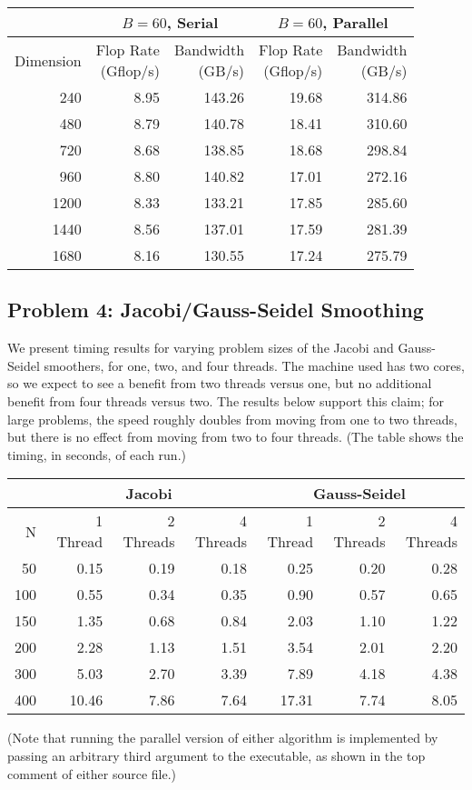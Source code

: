 \documentclass[11pt]{article}
\theoremstyle{plain} %
\begin{document}
\begin{center}
\small
\begin{tabular}{r|rr|rr}
  & \multicolumn{2}{c|}{$B = 60$, Serial} & \multicolumn{2}{c}{$B = 60$, Parallel} \\
  \hline
  Dimension & \makecell{Flop Rate \\ (Gflop/s)} & \makecell{Bandwidth \\ (GB/s)} & \makecell{Flop Rate \\ (Gflop/s)} & \makecell{Bandwidth \\ (GB/s)} \\
  \hline
  240 & 8.95 & 143.26 & 19.68 & 314.86 \\
  480 & 8.79 & 140.78 & 18.41 & 310.60 \\
  720 & 8.68 & 138.85 & 18.68 & 298.84 \\
  960 & 8.80 & 140.82 & 17.01 & 272.16 \\
  1200 & 8.33 & 133.21 & 17.85 & 285.60 \\
  1440 & 8.56 & 137.01 & 17.59 & 281.39 \\
  1680 & 8.16 & 130.55 & 17.24 & 275.79 \\
  \hline
\end{tabular}
\end{center}

\subsection*{Problem 4: Jacobi/Gauss-Seidel Smoothing}

We present timing results for varying problem sizes of the Jacobi and Gauss-Seidel smoothers, for one, two, and four threads.
The machine used has two cores, so we expect to see a benefit from two threads versus one, but no additional benefit from four threads versus two.
The results below support this claim; for large problems, the speed roughly doubles from moving from one to two threads, but there is no effect from moving from two to four threads.
(The table shows the timing, in seconds, of each run.)

\begin{center}
\small
\begin{tabular}{r|rrr|rrr}
  & \multicolumn{3}{c|}{Jacobi} & \multicolumn{3}{c}{Gauss-Seidel} \\
  \hline
  N & 1 Thread & 2 Threads & 4 Threads & 1 Thread & 2 Threads & 4 Threads \\
  \hline
  50 & 0.15 & 0.19 & 0.18 & 0.25 & 0.20 & 0.28 \\
  100 & 0.55 & 0.34 & 0.35 & 0.90 & 0.57 & 0.65 \\
  150 & 1.35 & 0.68 & 0.84 & 2.03 & 1.10 & 1.22 \\
  200 & 2.28 & 1.13 & 1.51 & 3.54 & 2.01 & 2.20 \\
  300 & 5.03 & 2.70 & 3.39 & 7.89 & 4.18 & 4.38 \\
  400 & 10.46 & 7.86 & 7.64 & 17.31 & 7.74 & 8.05 \\
  \hline
\end{tabular}
\end{center}

\noindent
(Note that running the parallel version of either algorithm is implemented by passing an arbitrary third argument to the executable, as shown in the top comment of either source file.)
\end{document}
